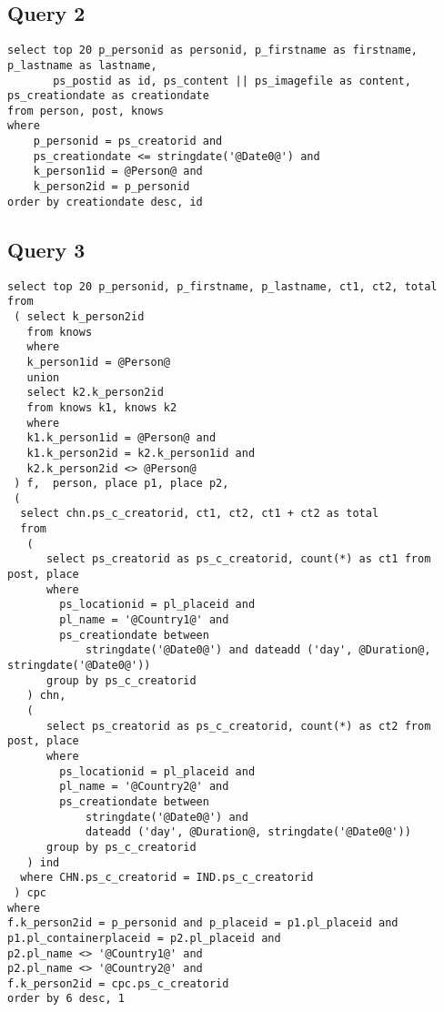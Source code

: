 \subsection{Query 2}
{\footnotesize
\begin{verbatim}
select top 20 p_personid as personid, p_firstname as firstname, p_lastname as lastname,
       ps_postid as id, ps_content || ps_imagefile as content, ps_creationdate as creationdate
from person, post, knows
where
    p_personid = ps_creatorid and
    ps_creationdate <= stringdate('@Date0@') and
    k_person1id = @Person@ and
    k_person2id = p_personid
order by creationdate desc, id
\end{verbatim}
}

\subsection{Query 3}

{\footnotesize
\begin{verbatim}
select top 20 p_personid, p_firstname, p_lastname, ct1, ct2, total
from
 ( select k_person2id
   from knows
   where
   k_person1id = @Person@
   union
   select k2.k_person2id
   from knows k1, knows k2
   where
   k1.k_person1id = @Person@ and 
   k1.k_person2id = k2.k_person1id and 
   k2.k_person2id <> @Person@
 ) f,  person, place p1, place p2,
 (
  select chn.ps_c_creatorid, ct1, ct2, ct1 + ct2 as total
  from
   (
      select ps_creatorid as ps_c_creatorid, count(*) as ct1 from post, place
      where
        ps_locationid = pl_placeid and 
        pl_name = '@Country1@' and
        ps_creationdate between 
            stringdate('@Date0@') and dateadd ('day', @Duration@, stringdate('@Date0@'))
      group by ps_c_creatorid
   ) chn,
   (
      select ps_creatorid as ps_c_creatorid, count(*) as ct2 from post, place
      where
        ps_locationid = pl_placeid and 
        pl_name = '@Country2@' and
        ps_creationdate between 
            stringdate('@Date0@') and 
            dateadd ('day', @Duration@, stringdate('@Date0@'))
      group by ps_c_creatorid
   ) ind
  where CHN.ps_c_creatorid = IND.ps_c_creatorid
 ) cpc
where
f.k_person2id = p_personid and p_placeid = p1.pl_placeid and
p1.pl_containerplaceid = p2.pl_placeid and 
p2.pl_name <> '@Country1@' and 
p2.pl_name <> '@Country2@' and
f.k_person2id = cpc.ps_c_creatorid
order by 6 desc, 1
\end{verbatim}
}
 

